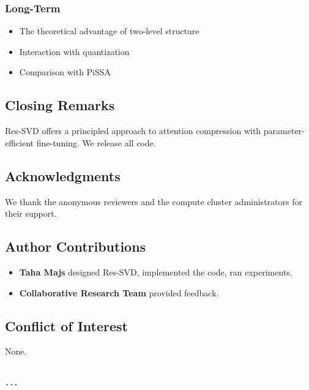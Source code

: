 \subsubsection{Long-Term}
\begin{itemize}
\item The theoretical advantage of two-level structure
\item Interaction with quantization
\item Comparison with PiSSA

\end{itemize}
\subsection{Closing Remarks}

Res-SVD offers a principled approach to attention compression with 
parameter-efficient fine-tuning. We release all code.

\subsection{Acknowledgments}

We thank the anonymous reviewers and the compute cluster administrators for their support.

\subsection{Author Contributions}

\begin{itemize}
\item \textbf{Taha Majs} designed Res-SVD, implemented the code, ran experiments.
\item \textbf{Collaborative Research Team} provided feedback.

\end{itemize}
\subsection{Conflict of Interest}

None.
\begin{lstlisting}

---
\end{lstlisting}